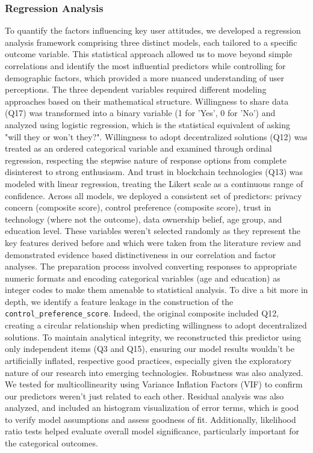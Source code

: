 	\subsubsection{Regression Analysis}
	To quantify the factors influencing key user attitudes, we developed a regression analysis framework comprising three distinct models, each tailored to a specific outcome variable. This statistical approach allowed us to move beyond simple correlations and identify the most influential predictors while controlling for demographic factors, which provided a more nuanced understanding of user perceptions.
	The three dependent variables required different modeling approaches based on their mathematical structure. Willingness to share data (Q17) was transformed into a binary variable (1 for 'Yes', 0 for 'No') and analyzed using logistic regression, which is the statistical equivalent of asking "will they or won't they?".
	Willingness to adopt decentralized solutions (Q12) was treated as an ordered categorical variable and examined through ordinal regression, respecting the stepwise nature of response options from complete disinterest to strong enthusiasm. And trust in blockchain technologies (Q13) was modeled with linear regression, treating the Likert scale as a continuous range of confidence.
	Across all models, we deployed a consistent set of predictors: privacy concern (composite score), control preference (composite score), trust in technology (where not the outcome), data ownership belief, age group, and education level. These variables weren't selected randomly as they represent the key features derived before and which were taken from the literature review and demonstrated evidence based distinctiveness in our correlation and factor analyses. The preparation process involved converting responses to appropriate numeric formats and encoding categorical variables (age and education) as integer codes to make them amenable to statistical analysis.
	To dive a bit more in depth, we identify a feature leakage in the construction of the \texttt{control\_preference\_score}. Indeed, the original composite included Q12, creating a circular relationship when predicting willingness to adopt decentralized solutions. To maintain analytical integrity, we reconstructed this predictor using only independent items (Q3 and Q15), ensuring our model results wouldn't be artificially inflated, respective good practices, especially given the exploratory nature of our research into emerging technologies.
	Robustness was also  analyzed. We tested for multicollinearity using Variance Inflation Factors (VIF) to confirm our predictors weren't just related to each other. Residual analysis was also analyzed, and included an histogram visualization of error terms, which is good to verify model assumptions and assess goodness of fit. Additionally, likelihood ratio tests helped evaluate overall model significance, particularly important for the categorical outcomes.
	

